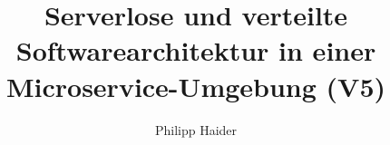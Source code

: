 \documentclass[master,german]{hgbthesis}
\title{Serverlose und verteilte Softwarearchitektur in einer Microservice-Umgebung (V5)}
\author{Philipp Haider}
\begin{document}

\frontmatter                    %

\maketitle
\tableofcontents

		
			

\mainmatter          %








%

\appendix                                            %


\MakeBibliography                        %

%

\end{document}
